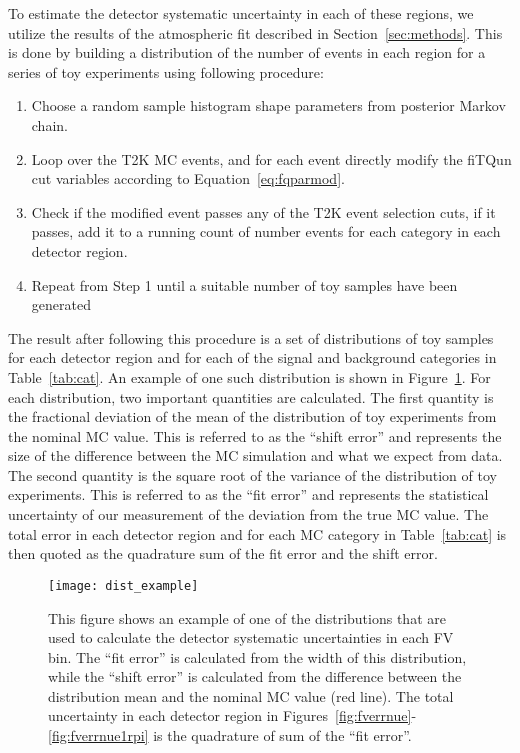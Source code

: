 To estimate the detector systematic uncertainty in each of these regions, we
utilize the results of the atmospheric fit described in
Section~\ref{sec:methods}. This is done by building a distribution of the
number of events in each region for a series of toy experiments using following
procedure:

\begin{enumerate}
  \item Choose a random sample histogram shape parameters from posterior Markov chain.
  \item Loop over the T2K MC events, and for each event directly modify the fiTQun cut variables
    according to Equation~\ref{eq:fqparmod}.
  \item Check if the modified event passes any of the T2K event selection cuts,
    if it passes, add it to a running
    count of number events for each category in each detector region.
  \item Repeat from Step 1 until a suitable number of toy samples have been generated
\end{enumerate}

The result after following this procedure is a set of distributions of toy
samples for each detector region and for each of the signal and background
categories in Table~\ref{tab:cat}.  An example of one such distribution is
shown in Figure~\ref{fig:fverrsinglebin}.  For each distribution, two important
quantities are calculated.  The first quantity is the fractional deviation of
the mean of the distribution of toy experiments from the nominal MC value.
This is referred to as the ``shift error'' and represents the size of the
difference between the MC simulation and what we expect from data.  The second
quantity is the square root of the variance of the distribution of toy
experiments.  This is referred to as the ``fit error'' and represents the
statistical uncertainty of our measurement of the deviation from the true MC
value.  The total error in each detector region and for each MC category in
Table~\ref{tab:cat} is then quoted as the quadrature sum of the fit error and
the shift error. 

\begin{figure}[h]
  \begin{center}
    \texttt{[image: dist\_example]}
  \end{center}
  \caption{This figure shows an example of one of the distributions that are
  used to calculate the detector systematic uncertainties in each FV bin.  The
  ``fit error'' is calculated from the width of this distribution, while the
  ``shift error'' is calculated from the difference between the distribution
  mean and the nominal MC value (red line).  The total uncertainty in each
  detector region in Figures~\ref{fig:fverrnue}-\ref{fig:fverrnue1rpi} is the
  quadrature of sum of the ``fit error''.}
  \label{fig:fverrsinglebin}
\end{figure}

